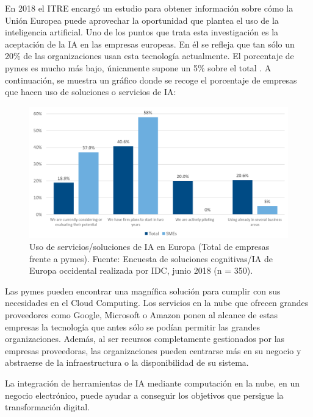 En 2018 el ITRE encargó un estudio para obtener información sobre cómo la Unión Europea puede aprovechar la oportunidad que plantea el uso de la inteligencia artificial. Uno de los puntos que trata esta investigación es la aceptación de la IA en las empresas europeas. En él se refleja que tan sólo un 20\% de las organizaciones usan esta tecnología actualmente. El porcentaje de pymes es mucho más bajo, únicamente supone un 5\% sobre el total \cite{EuropeAI}. A continuación, se muestra un gráfico donde se recoge el porcentaje de empresas que hacen uso de soluciones o servicios de IA:

\begin{figure}[htbp]
	\begin{center}
		\includegraphics[width = 1\textwidth]{Figuras/AIUse.PNG}
	\end{center}
	\caption{\label{fig:AIBarriers} Uso de servicios/soluciones de IA en Europa (Total de empresas frente a pymes). Fuente: Encuesta de soluciones cognitivas/IA de Europa occidental realizada por IDC, junio 2018 (n = 350).}
\end{figure}

\newpage

Las pymes pueden encontrar una magnífica solución para cumplir con sus necesidades en el Cloud Computing. Los servicios en la nube que ofrecen grandes proveedores como Google, Microsoft o Amazon ponen al alcance de estas empresas la tecnología que antes sólo se podían permitir las grandes organizaciones. Además, al ser recursos completamente gestionados por las empresas proveedoras, las organizaciones pueden centrarse más en su negocio y abstraerse de la infraestructura o la disponibilidad de su sistema. 

La integración de herramientas de IA mediante computación en la nube, en un negocio electrónico, puede ayudar a conseguir los objetivos que persigue la transformación digital. 

